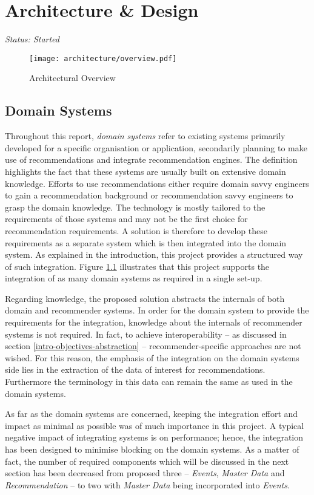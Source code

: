 \chapter{Architecture \& Design}

\emph{Status: Started}

\begin{figure}[ht]
    \texttt{[image: architecture/overview.pdf]}
    \caption{Architectural Overview}
    \label{fig:architecture}
\end{figure}

\section{Domain Systems}
\label{architecture-domain-systems}

Throughout this report, \emph{domain systems} refer to existing systems primarily developed for a specific organisation or application, secondarily planning to make use of recommendations and integrate recommendation engines. The definition highlights the fact that these systems are usually built on extensive domain knowledge. Efforts to use recommendations either require domain savvy engineers to gain a recommendation background or recommendation savvy engineers to grasp the domain knowledge. The technology is mostly tailored to the requirements of those systems and may not be the first choice for recommendation requirements. A solution is therefore to develop these requirements as a separate system which is then integrated into the domain system. As explained in the introduction, this project provides a structured way of such integration. Figure \ref{fig:architecture} illustrates that this project supports the integration of as many domain systems as required in a single set-up.

Regarding knowledge, the proposed solution abstracts the internals of both domain and recommender systems. In order for the domain system to provide the requirements for the integration, knowledge about the internals of recommender systems is not required. In fact, to achieve interoperability -- as discussed in section \ref{intro-objectives-abstraction} -- recommender-specific approaches are not wished. For this reason, the emphasis of the integration on the domain systems side lies in the extraction of the data of interest for recommendations. Furthermore the terminology in this data can remain the same as used in the domain systems.

As far as the domain systems are concerned, keeping the integration effort and impact as minimal as possible was of much importance in this project. A typical negative impact of integrating systems is on performance; hence, the integration has been designed to minimise blocking on the domain systems. As a matter of fact, the number of required components which will be discussed in the next section has been decreased from proposed three -- \emph{Events}, \emph{Master Data} and \emph{Recommendation} -- to two with \emph{Master Data} being incorporated into \emph{Events}.

